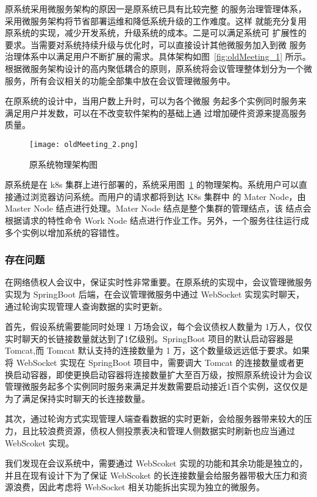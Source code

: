 原系统采用微服务架构的原因一是原系统已具有比较完整
的服务治理管理体系，采用微服务架构将节省部署运维和降低系统升级的工作难度。这样
就能充分复用原系统的实现，减少开发系统，升级系统的成本。二是可以满足系统可
扩展性的要求。当需要对系统持续升级与优化时，可以直接设计其他微服务加入到微
服务治理体系中以满足用户不断扩展的需求。具体架构如图~\ref{fig:oldMeeting_1}\cite{Wang2021} 所示。根据微服务架构设计的高内聚低耦合的原则，原系统将会议管理整体划分为一个微服务，所有会议相关的功能全部集中放在会议管理微服务中。

在原系统的设计中，当用户数上升时，可以为各个微服
务起多个实例同时服务来满足用户并发数，可以在不改变软件架构的基础上通
过增加硬件资源来提高服务质量。

\begin{figure}[!htp]
  \centering
  \texttt{[image: oldMeeting\_2.png]}
  \caption[原物理架构]
    {原系统物理架构图\cite{Wang2021}}
 \label{fig:oldMeeting_2}
\end{figure}

原系统是在 k8s 集群上进行部署的，系统采用图~\ref{fig:oldMeeting_2}
的物理架构。系统用户可以直接通过浏览器访问系统。而用户的请求都将到达 K8s 集群中
的 Mater Node，由 Master Node 结点进行处理。Mater Node 结点是整个集群的管理结点，该
结点会根据请求的特性命令 Work Node 结点进行作业工作。另外，一个服务往往运行成多个实例以增加系统的容错性。


\nocite{Wang2021}
\subsubsection{存在问题}

在网络债权人会议中，保证实时性非常重要。在原系统的实现中，会议管理微服务实现为 SpringBoot 后端，在会议管理微服务中通过 WebSocket 实现实时聊天，通过轮询实现管理人查询数据的实时更新。

首先，假设系统需要能同时处理 1 万场会议，每个会议债权人数量为 1万人，仅仅实时聊天的长链接数量就达到了1亿级别。SpringBoot 项目的默认启动容器是 Tomcat,而 Tomcat 默认支持的连接数量为 1 万，这个数量级远远低于要求。如果将 WebSocket 实现在 SpringBoot 项目中，需要调大 Tomcat 的连接数量或者更换启动容器，即使更换启动容器将连接数量扩大至百万级，按照原系统设计为会议管理微服务起多个实例同时服务来满足并发数需要启动接近1百个实例，这仅仅是为了满足保持实时聊天的长连接数量。

其次，通过轮询方式实现管理人端查看数据的实时更新，会给服务器带来较大的压力，且比较浪费资源，债权人侧投票表决和管理人侧数据实时刷新也应当通过 WebScoket 实现。

我们发现在会议系统中，需要通过 WebScoket 实现的功能和其余功能是独立的，并且在现有设计下为了保证 WebScoket 的长连接数量会给服务器带极大压力和资源浪费，因此考虑将 WebSocket 相关功能拆出实现为独立的微服务。

